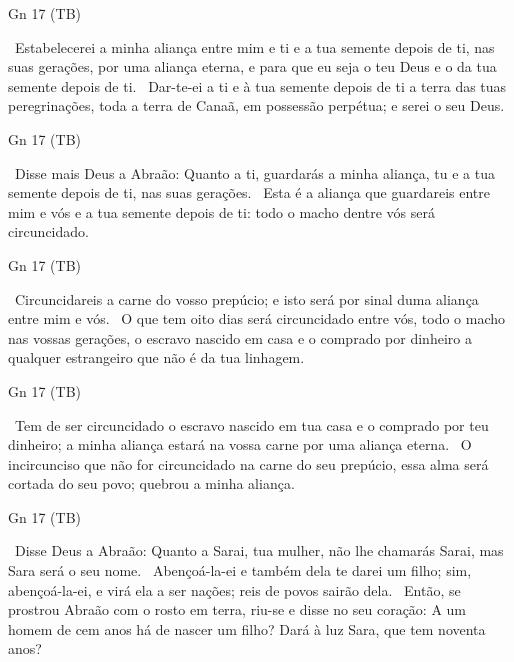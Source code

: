 \documentclass[12pt,aspectratio=169]{beamer}
\newcommand{\ver}[1]{%
    \raisebox{0.50ex}{%
        \scalebox{1.1}{%
            \pmb{\textbf{\textcolor{BSpbg}{#1}}}%
        }%
    }%
}
\newcommand{\QUOTE}[1]{%
    \par\noindent\hspace*{0.05\linewidth}%
    \begin{minipage}{0.9\linewidth}%
        \linespread{1.35}\large{#1}%
    \end{minipage}%
}
\newcommand{\RED}[1]{{\textcolor{TXred}{#1}}}
\newcommand{\ORA}[1]{{\textcolor{TXred!50!TXyel}{#1}}}
\newcommand{\YEL}[1]{{\textcolor{TXyel}{#1}}}
\newcommand{\GRE}[1]{{\textcolor{TXgre}{#1}}}
\newcommand{\CYA}[1]{{\textcolor{TXcya}{#1}}}
\newcommand{\BLU}[1]{{\textcolor{TXblu}{#1}}}
\newcommand{\MAG}[1]{{\textcolor{TXmag}{#1}}}
\newcommand{\BRI}[1]{{\textcolor{BSpbg}{#1}}}   %
\begin{document}
    \begin{frame}{\BRI{Gn 17} (TB)}
        \QUOTE{%
            \ver{7}~\YEL{Estabelecerei} a minha aliança \GRE{entre mim e ti e a tua semente
            depois de ti}, nas suas gerações, por uma \CYA{aliança eterna}, e para que \BLU{eu
            seja o teu Deus e o da tua semente depois de ti}.
            \ver{8}~Dar-te-ei a \YEL{ti} e à tua \YEL{semente} depois de ti a \YEL{terra} das
            tuas peregrinações, toda a \YEL{terra} de Canaã, em \GRE{possessão} \YEL{perpétua};
            e \BLU{serei o seu Deus}.
        }
    \end{frame}

    \begin{frame}{\BRI{Gn 17} (TB)}
        \QUOTE{%
            \ver{9}~Disse mais Deus a Abraão: Quanto a ti, \MAG{guardarás a minha aliança, tu e
            a tua semente} depois de ti, nas suas gerações.
            \ver{10}~\YEL{Esta é} a aliança que \YEL{guardareis} entre mim e vós e a tua semente
            depois de ti: \MAG{todo o macho dentre vós será circuncidado}.
        }
    \end{frame}

    \begin{frame}{\BRI{Gn 17} (TB)}
        \QUOTE{%
            \ver{11}~\MAG{Circuncidareis} a carne do vosso prepúcio; e isto será por \YEL{sinal
            duma aliança} entre mim e vós.
            \ver{12}~O que tem \GRE{oito dias} será circuncidado entre vós, todo o macho nas
            vossas gerações, o \YEL{escravo nascido} em casa \ORA{e o comprado} por dinheiro a
            qualquer \ORA{estrangeiro que não é da tua linhagem}.
        }
    \end{frame}

    \begin{frame}{\BRI{Gn 17} (TB)}
        \QUOTE{%
            \ver{13}~Tem de ser circuncidado o escravo nascido em tua casa e o comprado por teu
            dinheiro; a minha aliança estará na vossa carne por uma \YEL{aliança eterna}.
            \ver{14}~O \RED{incircunciso} que não for circuncidado na carne do seu prepúcio,
            \YEL{essa alma} será cortada do seu povo; \RED{quebrou} a minha aliança.
        }
    \end{frame}

    \begin{frame}{\BRI{Gn 17} (TB)}
        \QUOTE{%
            \ver{15}~Disse Deus a Abraão: Quanto a Sarai, tua mulher, não lhe chamarás Sarai,
            mas \YEL{Sara} será o seu nome.
            \ver{16}~Abençoá-la-ei e também \YEL{dela} te darei um filho; sim, abençoá-la-ei, e
            virá ela a ser nações; \MAG{reis} de povos sairão \YEL{dela}.
            \ver{17}~Então, se prostrou Abraão com o rosto em terra, riu-se e disse no seu
            coração: A um homem de cem anos há de nascer um filho? Dará à luz Sara, que tem
            noventa anos?
        }
    \end{frame}
\end{document}
